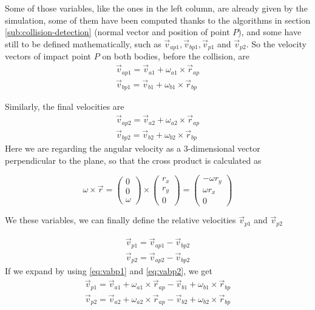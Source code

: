 Some of those variables, like the ones in the left column, are already given by
the simulation, some of them have been computed thanks to the algorithms in
section \ref{sub:collision-detection} (normal vector and position of point $P$),
and some have still to be defined mathematically, such as $\vec v_{ap1},\vec
	v_{bp1},\vec v_{p1}$ and $\vec v_{p2}$. So the velocity vectors of impact
point $P$ on both bodies, before the collision, are
\begin{equation} \label{eq:vabp1}
	\begin{split}
		\vec v_{ap1} = \vec v_{a1} + \omega_{a1} \times \vec r_{ap} \\
		\vec v_{bp1} = \vec v_{b1} + \omega_{b1} \times \vec r_{bp}
	\end{split}
\end{equation}

Similarly, the final velocities are
\begin{equation} \label{eq:vabp2}
	\begin{split}
		\vec v_{ap2} = \vec v_{a2} + \omega_{a2} \times \vec r_{ap}\\
		\vec v_{bp2} = \vec v_{b2} + \omega_{b2} \times \vec r_{bp}
	\end{split}
\end{equation}
Here we are regarding the angular velocity as a 3-dimensional vector
perpendicular to the plane, so that the cross product is calculated as

$$ \omega \times \vec r = \begin{pmatrix} 0\\0\\\omega \end{pmatrix} \times
	\begin{pmatrix} r_x\\r_y\\0 \end{pmatrix} = \begin{pmatrix} -\omega r_y \\
		\omega r_x  \\0\end{pmatrix}  $$

We these variables, we can finally define the relative velocities $\vec
	v_{p1}$ and $\vec v_{p2}$

\[ \begin{split}
		\vec v_{p1} = \vec v_{ap1} - \vec v_{bp2}\\
		\vec v_{p2} = \vec v_{ap2} - \vec v_{bp2}
	\end{split} \]
If we expand by using \ref{eq:vabp1} and \ref{eq:vabp2}, we get
\begin{equation}
	\begin{split}
		\vec v_{p1} = \vec v_{a1} + \omega_{a1} \times \vec r_{ap} - \vec v_{b1}
		+ \omega_{b1} \times \vec r_{bp}\\
		\vec v_{p2} = \vec v_{a2} + \omega_{a2} \times \vec r_{ap} - \vec v_{b2} + \omega_{b2} \times \vec r_{bp}
	\end{split}
\end{equation}

